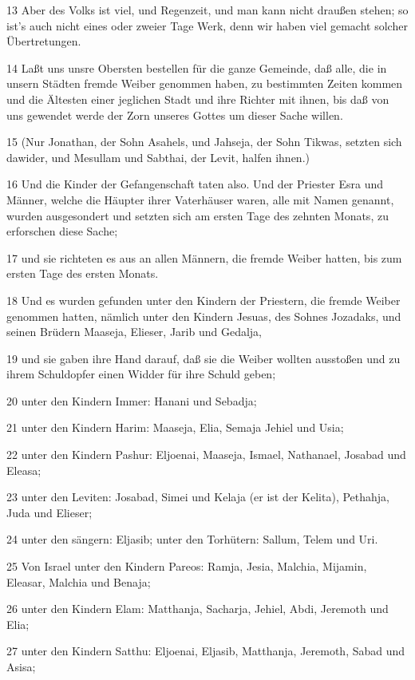 \par 13 Aber des Volks ist viel, und Regenzeit, und man kann nicht draußen stehen; so ist's auch nicht eines oder zweier Tage Werk, denn wir haben viel gemacht solcher Übertretungen.
\par 14 Laßt uns unsre Obersten bestellen für die ganze Gemeinde, daß alle, die in unsern Städten fremde Weiber genommen haben, zu bestimmten Zeiten kommen und die Ältesten einer jeglichen Stadt und ihre Richter mit ihnen, bis daß von uns gewendet werde der Zorn unseres Gottes um dieser Sache willen.
\par 15 (Nur Jonathan, der Sohn Asahels, und Jahseja, der Sohn Tikwas, setzten sich dawider, und Mesullam und Sabthai, der Levit, halfen ihnen.)
\par 16 Und die Kinder der Gefangenschaft taten also. Und der Priester Esra und Männer, welche die Häupter ihrer Vaterhäuser waren, alle mit Namen genannt, wurden ausgesondert und setzten sich am ersten Tage des zehnten Monats, zu erforschen diese Sache;
\par 17 und sie richteten es aus an allen Männern, die fremde Weiber hatten, bis zum ersten Tage des ersten Monats.
\par 18 Und es wurden gefunden unter den Kindern der Priestern, die fremde Weiber genommen hatten, nämlich unter den Kindern Jesuas, des Sohnes Jozadaks, und seinen Brüdern Maaseja, Elieser, Jarib und Gedalja,
\par 19 und sie gaben ihre Hand darauf, daß sie die Weiber wollten ausstoßen und zu ihrem Schuldopfer einen Widder für ihre Schuld geben;
\par 20 unter den Kindern Immer: Hanani und Sebadja;
\par 21 unter den Kindern Harim: Maaseja, Elia, Semaja Jehiel und Usia;
\par 22 unter den Kindern Pashur: Eljoenai, Maaseja, Ismael, Nathanael, Josabad und Eleasa;
\par 23 unter den Leviten: Josabad, Simei und Kelaja (er ist der Kelita), Pethahja, Juda und Elieser;
\par 24 unter den sängern: Eljasib; unter den Torhütern: Sallum, Telem und Uri.
\par 25 Von Israel unter den Kindern Pareos: Ramja, Jesia, Malchia, Mijamin, Eleasar, Malchia und Benaja;
\par 26 unter den Kindern Elam: Matthanja, Sacharja, Jehiel, Abdi, Jeremoth und Elia;
\par 27 unter den Kindern Satthu: Eljoenai, Eljasib, Matthanja, Jeremoth, Sabad und Asisa;
